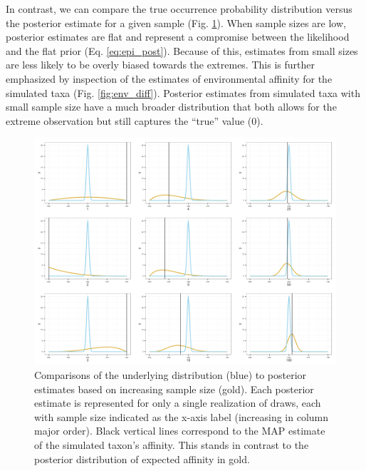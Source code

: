 \documentclass[12pt,letterpaper]{article}
\begin{document}
In contrast, we can compare the true occurrence probability distribution versus the posterior estimate for a given sample (Fig. \ref{fig:env_post}). When sample sizes are low, posterior estimates are flat and represent a compromise between the likelihood and the flat prior (Eq. \ref{eq:epi_post}). Because of this, estimates from small sizes are less likely to be overly biased towards the extremes. This is further emphasized by inspection of the estimates of environmental affinity for the simulated taxa (Fig. \ref{fig:env_diff}). Posterior estimates from simulated taxa with small sample size have a much broader distribution that both allows for the extreme observation but still captures the ``true'' value (0). 
\begin{figure}[ht]
  \centering
  \includegraphics[height = \textheight,width=\textwidth,keepaspectratio=true]{figure/env_post_inspect}
  \caption{Comparisons of the underlying distribution (blue) to posterior estimates based on increasing sample size (gold). Each posterior estimate is represented for only a single realization of draws, each with sample size indicated as the x-axis label (increasing in column major order). Black vertical lines correspond to the MAP estimate of the simulated taxon's affinity. This stands in contrast to the posterior distribution of expected affinity in gold.}
  \label{fig:env_post}
\end{figure}
\end{document}
